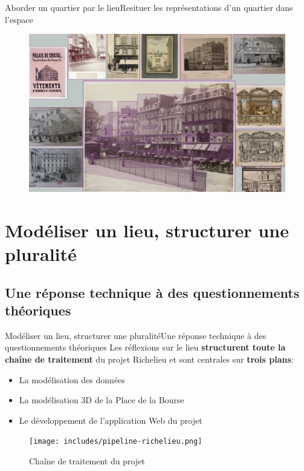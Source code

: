 \documentclass[8pt]{beamer}
\begin{document}
\begin{frame}{Aborder un quartier par le lieu}{Resituer les représentations d'un quartier dans l'espace}
	\begin{figure}
		\includegraphics[width=\textwidth]{includes/final_cha.png}
	\end{figure}
\end{frame}

\section{Modéliser un lieu, structurer une pluralité}
\subsection[Une réponse technique]{Une réponse technique à des questionnements théoriques}
\begin{frame}{Modéliser un lieu, structurer une pluralité}{Une réponse technique à des questionnements théoriques}
	Les réflexions sur le lieu \textbf{structurent toute la chaîne de traitement} du projet Richelieu et sont centrales sur \textbf{trois plans}:
	\begin{itemize}
		\item La modélisation des données
		\item La modélisation 3D de la Place de la Bourse
		\item Le développement de l'application Web du projet
	\end{itemize}
	\begin{figure}
		\texttt{[image: includes/pipeline-richelieu.png]}
		\caption{Chaîne de traitement du projet}
	\end{figure}
\end{frame}
\end{document}
